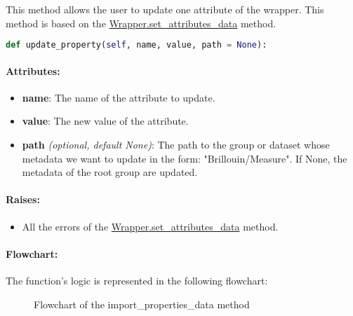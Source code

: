 This method allows the user to update one attribute of the wrapper. This method is based on the \hyperref[subchapter:wrapper.set_attributes_data]{Wrapper.set\_attributes\_data} method.

\begin{lstlisting}[language=Python]
def update_property(self, name, value, path = None):
\end{lstlisting}

\paragraph{Attributes:}

\begin{itemize}
    \item \textbf{name}: The name of the attribute to update.
    \item \textbf{value}: The new value of the attribute.
    \item \textbf{path} \textit{(optional, default None)}: The path to the group or dataset whose metadata we want to update in the form: "Brillouin/Measure". If None, the metadata of the root group are updated.
\end{itemize}

\paragraph{Raises:}
\begin{itemize}
    \item All the errors of the \hyperref[subchapter:wrapper.set_attributes_data]{Wrapper.set\_attributes\_data} method.
\end{itemize}


\paragraph{Flowchart:}

The function's logic is represented in the following flowchart:
\begin{figure}[H]
    \centering
    \label{fig:wrapper.flowchart_update_property}
    \small
    \caption{Flowchart of the import\_properties\_data method}
\end{figure}
